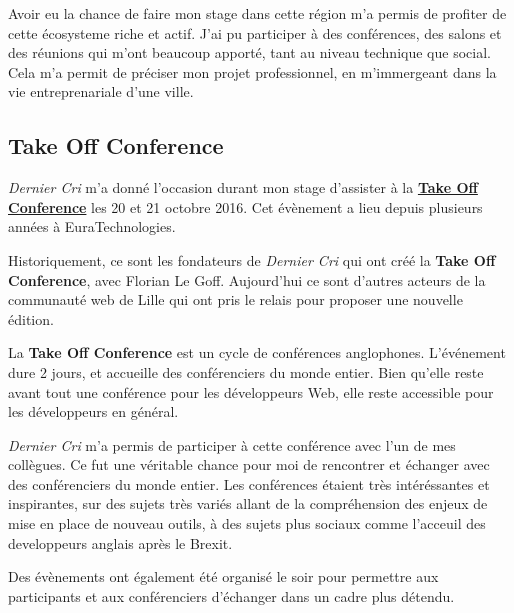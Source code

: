 \bigskip

Avoir eu la chance de faire mon stage dans cette région m'a permis de
profiter de cette écosysteme riche et actif. J'ai pu participer à des
conférences, des salons et des réunions qui m'ont beaucoup apporté, tant
au niveau technique que social. Cela m'a permit de préciser mon projet
professionnel, en m'immergeant dans la vie entreprenariale d'une ville.

\bigskip

\subsection{Take Off Conference}\label{take-off-conference}

\bigskip

\emph{Dernier Cri} m'a donné l'occasion durant mon stage d'assister à la
\href{http://takeoffconf.com/2016}{\textbf{Take Off Conference}} les 20
et 21 octobre 2016. Cet évènement a lieu depuis plusieurs années à
EuraTechnologies.

\bigskip

Historiquement, ce sont les fondateurs de \emph{Dernier Cri} qui ont
créé la \textbf{Take Off Conference}, avec Florian Le Goff. Aujourd'hui
ce sont d'autres acteurs de la communauté web de Lille qui ont pris le
relais pour proposer une nouvelle édition.

\bigskip

La \textbf{Take Off Conference} est un cycle de conférences anglophones.
L'événement dure 2 jours, et accueille des conférenciers du monde
entier. Bien qu'elle reste avant tout une conférence pour les
développeurs Web, elle reste accessible pour les développeurs en
général.

\bigskip

\emph{Dernier Cri} m'a permis de participer à cette conférence avec l'un
de mes collègues. Ce fut une véritable chance pour moi de rencontrer et
échanger avec des conférenciers du monde entier. Les conférences étaient
très intéréssantes et inspirantes, sur des sujets très variés allant de
la compréhension des enjeux de mise en place de nouveau outils, à des
sujets plus sociaux comme l'acceuil des developpeurs anglais après le
Brexit.

\bigskip

Des évènements ont également été organisé le soir pour permettre aux
participants et aux conférenciers d'échanger dans un cadre plus détendu.

\bigskip

